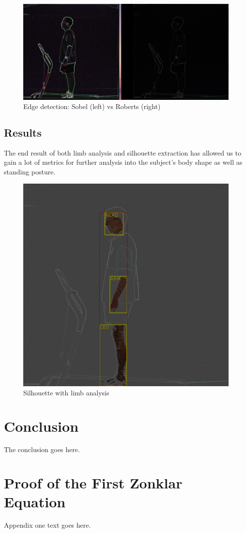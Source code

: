 \documentclass[10pt,journal,compsoc]{IEEEtran}
\begin{document}
\begin{figure}[!htb]
\centering
\includegraphics[width=0.7\linewidth]{edgeDetectionComp}
    \caption{Edge detection: Sobel (left) vs Roberts (right)}
\end{figure}

\subsection{Results}
The end result of both limb analysis and silhouette extraction has allowed us to gain a lot of metrics for further analysis into the subject's body shape as well as standing posture.

\begin{figure}[!htb]
\centering
\includegraphics[width=0.7\linewidth]{combined}
    \caption{Silhouette with limb analysis}
\end{figure}



\section{Conclusion}
The conclusion goes here.


\appendices
\section{Proof of the First Zonklar Equation}
Appendix one text goes here.
\end{document}
